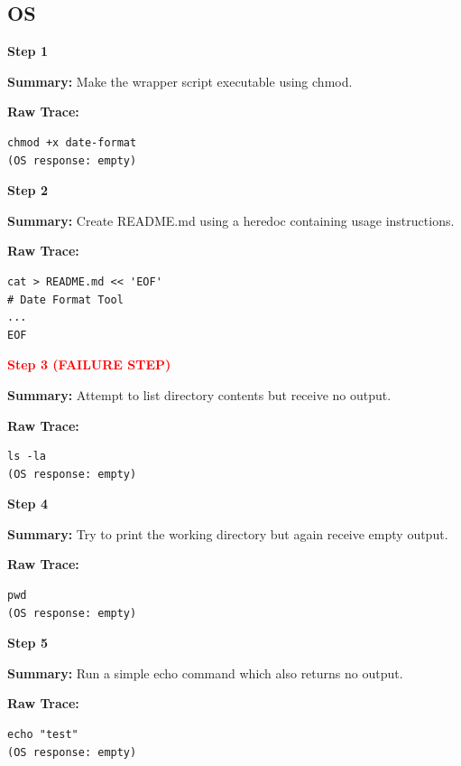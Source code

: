 \documentclass[11pt]{article}
\begin{document}
\subsection{OS}
\begin{tcolorbox}[
breakable,
colback=customwhite,
colframe=customyellow,
title=Environment,
fontupper=\fontfamily{pcr}\selectfont\scriptsize
]

\textbf{Step 1}

\textbf{Summary:}  
Make the wrapper script executable using chmod.

\textbf{Raw Trace:}
\begin{verbatim}
chmod +x date-format
(OS response: empty)
\end{verbatim}

\medskip
\textbf{Step 2}

\textbf{Summary:}  
Create README.md using a heredoc containing usage instructions.

\textbf{Raw Trace:}
\begin{verbatim}
cat > README.md << 'EOF'
# Date Format Tool
...
EOF
\end{verbatim}

\medskip
\textbf{\textcolor{red}{Step 3 (FAILURE STEP)}}

\textbf{Summary:}  
Attempt to list directory contents but receive no output.

\textbf{Raw Trace:}
\begin{verbatim}
ls -la
(OS response: empty)
\end{verbatim}

\medskip
\textbf{Step 4}

\textbf{Summary:}  
Try to print the working directory but again receive empty output.

\textbf{Raw Trace:}
\begin{verbatim}
pwd
(OS response: empty)
\end{verbatim}

\medskip
\textbf{Step 5}

\textbf{Summary:}  
Run a simple echo command which also returns no output.

\textbf{Raw Trace:}
\begin{verbatim}
echo "test"
(OS response: empty)
\end{verbatim}

\end{tcolorbox}
\end{document}
